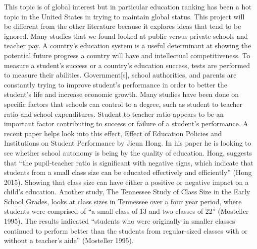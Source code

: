 \documentclass{article}
\begin{document}
This topic is of global interest but in particular education ranking has been a hot topic in the United States in trying to maintain global status. This project will be different from the other literature because it explores ideas that tend to be ignored. Many studies that we found looked at public versus private schools and teacher pay. A country's education system is a useful determinant at showing the potential future progress a country will have and intellectual competitiveness. To measure a student's success or a country’s education success, tests are performed to measure their abilities. Government[s], school authorities, and parents are constantly trying to improve student’s performance in order to better the student’s life and increase economic growth. Many studies have been done on specific factors that schools can control to a degree, such as student to teacher ratio and school expenditures. Student to teacher ratio appears to be an important factor contributing to success or failure of a student's performance. A recent paper helps look into this effect, Effect of Education Policies and Institutions on Student Performance by Jieun Hong. In his paper he is looking to see whether school autonomy is being by the quality of education. Hong, suggests that “the pupil-teacher ratio is significant with negative signs, which indicate that students from a small class size can be educated effectively and efficiently” (Hong 2015). Showing that class size can have either a positive or negative impact on a child's education. Another study, The Tennessee Study of Class Size in the Early School Grades, looks at class sizes in Tennessee over a four year period, where students were comprised of “a small class of 13 and two classes of 22” (Mosteller 1995). The results indicated “students who were originally in smaller classes continued to perform better than the students from regular-sized classes with or without a teacher’s aide” (Mosteller 1995).
\end{document}
